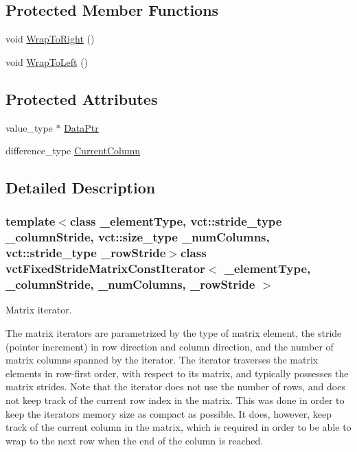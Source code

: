 \subsection*{Protected Member Functions}
\begin{DoxyCompactItemize}
\item 
void \hyperlink{classvct_fixed_stride_matrix_const_iterator_afa277bf20aa5dfe2ee106125042a0951}{Wrap\+To\+Right} ()
\item 
void \hyperlink{classvct_fixed_stride_matrix_const_iterator_aefa72290513bc63a442ee12d2fe86f0a}{Wrap\+To\+Left} ()
\end{DoxyCompactItemize}
\subsection*{Protected Attributes}
\begin{DoxyCompactItemize}
\item 
value\+\_\+type $\ast$ \hyperlink{classvct_fixed_stride_matrix_const_iterator_afcb4fd9b3a426eaa6b28e36d741a4b24}{Data\+Ptr}
\item 
difference\+\_\+type \hyperlink{classvct_fixed_stride_matrix_const_iterator_a2e5d93bb3d47edb6e75d294a520f6f32}{Current\+Column}
\end{DoxyCompactItemize}


\subsection{Detailed Description}
\subsubsection*{template$<$class \+\_\+element\+Type, vct\+::stride\+\_\+type \+\_\+column\+Stride, vct\+::size\+\_\+type \+\_\+num\+Columns, vct\+::stride\+\_\+type \+\_\+row\+Stride$>$class vct\+Fixed\+Stride\+Matrix\+Const\+Iterator$<$ \+\_\+element\+Type, \+\_\+column\+Stride, \+\_\+num\+Columns, \+\_\+row\+Stride $>$}

Matrix iterator. 

The matrix iterators are parametrized by the type of matrix element, the stride (pointer increment) in row direction and column direction, and the number of matrix columns spanned by the iterator. The iterator traverses the matrix elements in row-\/first order, with respect to its matrix, and typically possesses the matrix\textquotesingle{} strides. Note that the iterator does not use the number of rows, and does not keep track of the current row index in the matrix. This was done in order to keep the iterator\textquotesingle{}s memory size as compact as possible. It does, however, keep track of the current column in the matrix, which is required in order to be able to wrap to the next row when the end of the column is reached.

